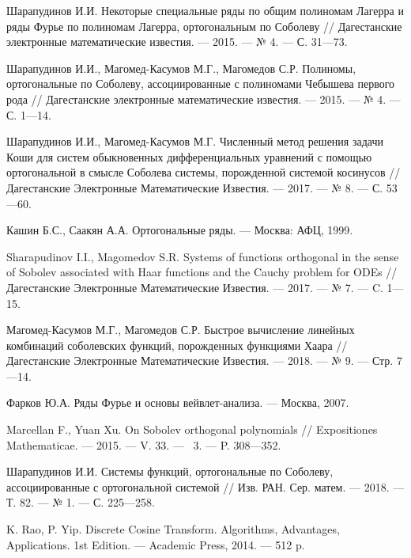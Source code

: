 \begin{thebibliography}{111}
Шарапудинов И.И. Некоторые специальные ряды по общим полиномам Лагерра и ряды Фурье по полиномам Лагерра, ортогональным по Соболеву // Дагестанские электронные математические известия. --- 2015. --- № 4. --- С. 31---73.

Шарапудинов И.И., Магомед-Касумов М.Г., Магомедов С.Р. Полиномы, ортогональные по Соболеву, ассоциированные с полиномами Чебышева первого рода // Дагестанские электронные математические известия. --- 2015. --- № 4. --- С. 1---14.

Шарапудинов И.И., Магомед-Касумов М.Г. Численный метод решения задачи Коши для систем обыкновенных дифференциальных уравнений с помощью ортогональной в смысле Соболева системы, порожденной системой косинусов // Дагестанские Электронные Математические Известия. --- 2017. --- № 8. --- С. 53---60.

Кашин Б.С., Саакян А.А. Ортогональные ряды. --- Москва: АФЦ, 1999.

Sharapudinov I.I., Magomedov S.R. Systems of functions orthogonal in the sense of Sobolev associated with Haar functions and the Cauchy problem for ODEs // Дагестанские Электронные Математические Известия. --- 2017. --- № 7. --- C. 1---15.

Магомед-Касумов М.Г., Магомедов С.Р. Быстрое вычисление линейных комбинаций соболевских функций, порожденных функциями Хаара // Дагестанские Электронные Математические Известия. --- 2018. --- № 9. --- Стр. 7---14.

Фарков Ю.А. Ряды Фурье и основы вейвлет-анализа. --- Москва, 2007.


 Marcellan F., Yuan Xu. On Sobolev orthogonal polynomials // Expositiones Mathematicae. --- 2015. --- V. 33. --- \No\ 3. --- P. 308---352.

 Шарапудинов И.И. Системы функций, ортогональные по Соболеву, ассоциированные с ортогональной системой // Изв. РАН. Сер. матем. --- 2018. --- Т. 82. --- № 1. --- С. 225---258.

K. Rao, P. Yip. Discrete Cosine Transform. Algorithms, Advantages, Applications. 1st Edition. --- Academic Press, 2014. --- 512 p.


\end{thebibliography}
